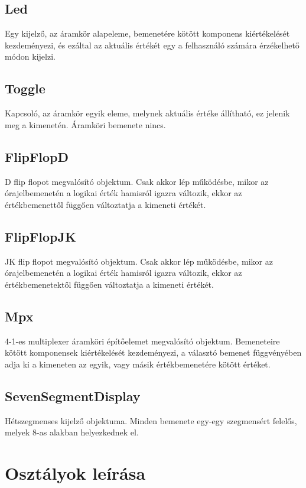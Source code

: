 \subsection{\bf Led}
Egy kijelző, az áramkör alapeleme, bemenetére kötött komponens kiértékelését kezdeményezi, és ezáltal az aktuális értékét egy a felhasználó számára érzékelhető módon kijelzi.

\subsection{\bf Toggle}
Kapcsoló, az áramkör egyik eleme, melynek aktuális értéke állítható, ez jelenik meg a kimenetén. Áramköri bemenete nincs.

\subsection{\bf FlipFlopD}
D flip flopot megvalósító objektum. Csak akkor lép működésbe, mikor az órajelbemenetén a logikai érték hamisról igazra változik, ekkor az értékbemenettől függően változtatja a kimeneti értékét.

\subsection{\bf FlipFlopJK}
JK flip flopot megvalósító objektum. Csak akkor lép működésbe, mikor az órajelbemenetén a logikai érték hamisról igazra változik, ekkor az értékbemenetektől függően változtatja a kimeneti értékét.

\subsection{\bf Mpx}
4-1-es multiplexer áramköri építőelemet megvalósító objektum. Bemeneteire kötött komponensek kiértékelését kezdeményezi, a választó bemenet függvényében adja ki a kimeneten az egyik, vagy másik értékbemenetére kötött értéket.

\subsection{\bf SevenSegmentDisplay}
Hétszegmenses kijelző objektuma. Minden bemenete egy-egy szegmensért felelős, melyek 8-as alakban helyezkednek el.

\section{Osztályok leírása}

